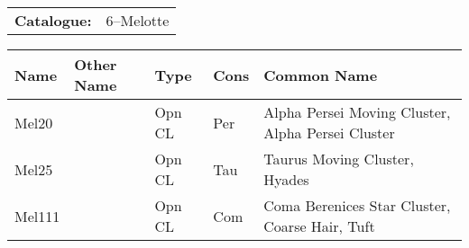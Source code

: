 \begin{tabular}{ p{0.9in} p{1.3in}}
{\bf Catalogue:} & 6--Melotte \\ 
\end{tabular}
\begin{longtable}{ p{0.7in}  p{1.0in}  p{0.6in}  p{0.9in}  p{5.1in} }
\hline 
{\bf Name} & {\bf Other Name} & {\bf Type} & {\bf Cons} & {\bf Common Name} \\ 
\hline 
Mel20 &  & Opn CL & Per & Alpha Persei Moving Cluster, Alpha Persei Cluster \\ 
Mel25 &  & Opn CL & Tau & Taurus Moving Cluster, Hyades \\ 
Mel111 &  & Opn CL & Com & Coma Berenices Star Cluster, Coarse Hair, Tuft \\ 
\hline 
\end{longtable} 
